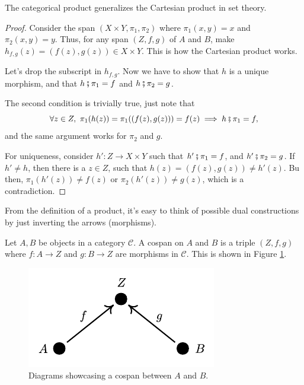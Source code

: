 \begin{proposition}
	The categorical product generalizes the Cartesian product in set theory.
\end{proposition}
\begin{proof}
	Consider the span $(X\times Y, \pi_1,\pi_2)$ where $\pi_1(x,y) = x$ and $\pi_2(x,y) = y$.
	Thus, for any span $(Z, f, g)$ of $A$ and $B$, make $h_{f,g}(z) = (f(z), g(z)) \in X \times Y$.
	This is how the Cartesian product works.

	Let's drop the subscript in $h_{f,g}$.
	Now we have to show that $h$ is a unique morphism,
	and that $h \fatsemi \pi_1 = f$ and $h \fatsemi \pi_2 = g$.

	The second condition is trivially true, just note that
	\begin{displaymath}
		\forall z \in Z, \ \pi_1(h(z)) = \pi_1((f(z), g(z))) = f(z) \implies
		h \fatsemi \pi_1 = f,
	\end{displaymath}
	and the same argument works for $\pi_2$ and $g$.

	For uniqueness, consider $h':Z\to X\times Y$ such that
	$h' \fatsemi \pi_1 = f$, and $h' \fatsemi \pi_2 = g$.
	If $h' \neq h$, then there is a $z \in Z$,
	such that $h(z) = (f(z), g(z)) \neq h'(z)$. Bu then,
	$\pi_1(h'(z)) \neq f(z)$ or $\pi_2(h'(z)) \neq g(z)$, which
	is a contradiction.

\end{proof}

From the definition of a product, it's easy to think of possible dual constructions
by just inverting the arrows (morphisms).

\begin{definition}[Cospan]
	Let $A,B$ be objects in a  category $\mathcal C$. A cospan
	on $A$ and $B$ is a triple $(Z,f,g)$ where $f:A\to Z$ and
	$g:B\to Z$ are morphisms in $\mathcal C$. This is
	shown in Figure \ref{fig:Cospan}.
\end{definition}

\begin{figure}[H]
	\begin{center}
		\includegraphics{./notebooks/Cospan.pdf}
	\end{center}
	\caption{Diagrams showcasing a cospan between $A$ and $B$.}
	\label{fig:Cospan}
\end{figure}

